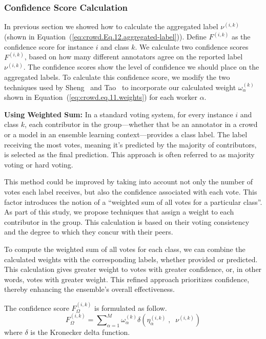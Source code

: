 \subsubsection{Confidence Score Calculation}
In previous section we showed how to calculate the aggregated label $\nu^{(i,k)}$ (shown in Equation~(\ref{eq:crowd.Eq.12.aggregated-label})). Define $F^{(i,k)} $ as the confidence score for instance $i $ and class $k $. We calculate two confidence scores $F^{(i,k)} $, based on how many different annotators agree on the reported label $\nu^{(i,k)}$. The confidence scores show the level of confidence we should place on the aggregated labels. To calculate this confidence score, we modify the two techniques used by Sheng~\cite{sheng_Majority_2019} and Tao~\cite{tao_Label_2020} to incorporate our calculated weight $\omega_{\alpha}^{(k)} $ shown in Equation~(\ref{eq:crowd.eq.11.weights})  for each worker $\alpha $.

\textbf{Using Weighted Sum:}
In a standard voting system, for every instance $i$ and class $k$, each contributor in the group—whether that be an annotator in a crowd or a model in an ensemble learning context—provides a class label. The label receiving the most votes, meaning it's predicted by the majority of contributors, is selected as the final prediction. This approach is often referred to as majority voting or hard voting.

This method could be improved by taking into account not only the number of votes each label receives, but also the confidence associated with each vote. This factor introduces the notion of a ``weighted sum of all votes for a particular class''. As part of this study, we propose techniques that assign a weight to each contributor in the group. This calculation is based on their voting consistency and the degree to which they concur with their peers.

To compute the weighted sum of all votes for each class, we can combine the calculated weights with the corresponding labels, whether provided or predicted. This calculation gives greater weight to votes with greater confidence, or, in other words, votes with greater weight. This refined approach prioritizes confidence, thereby enhancing the ensemble's overall effectiveness.

The confidence score $F_{\Omega}^{(i,k)}$ is formulated as follow.
\begin{equation}
    F_{\Omega}^{(i,k)} = {\sum\nolimits_{\alpha=1}^{M}{\omega_{\alpha}^{(k)} \delta\left(\eta_{\alpha}^{(i,k)} \;,\;\; \nu^{(i,k)} \right)}}
    \label{eq:crowd.Eq.13.confidence-score.Freq}
\end{equation}
where $\delta $ is the Kronecker delta function.

